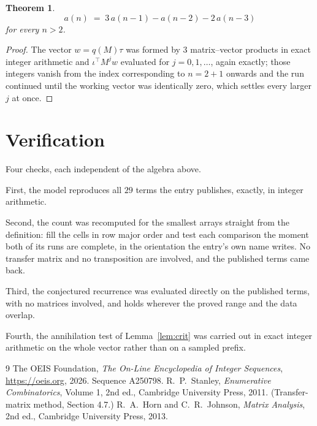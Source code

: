 \documentclass[11pt,a4paper]{article}
\theoremstyle{plain}
\newtheorem{theorem}{Theorem}
\theoremstyle{definition}
\begin{document}
\begin{theorem}
\[
a(n)\;=\;3\,a(n-1) - a(n-2) - 2\,a(n-3)
\]
for every $n>2$.
\end{theorem}

\begin{proof}
The vector $w=q(M)\tau$ was formed by $3$ matrix--vector products in exact integer
arithmetic and $\iota^{\!\top}M^{j}w$ evaluated for $j=0,1,\dots$, again exactly; those
integers vanish from the index corresponding to $n=2+1$ onwards and the run continued
until the working vector was identically zero, which settles every larger $j$ at once.
\end{proof}

\section{Verification}

Four checks, each independent of the algebra above.

First, the model reproduces all $29$ terms the entry publishes, exactly, in integer
arithmetic.

Second, the count was recomputed for the smallest arrays straight from the definition: fill the
cells in row major order and test each comparison the moment both of its runs are complete,
in the orientation the entry's own name writes. No transfer matrix and no transposition are
involved, and the published terms came back.

Third, the conjectured recurrence was evaluated directly on the published terms, with no
matrices involved, and holds wherever the proved range and the data overlap.

Fourth, the annihilation test of Lemma~\ref{lem:crit} was carried out in exact integer
arithmetic on the whole vector rather than on a sampled prefix.

\begin{thebibliography}{9}
 The OEIS Foundation, \emph{The On-Line Encyclopedia of Integer
Sequences}, \url{https://oeis.org}, 2026. Sequence A250798.
 R.~P.~Stanley, \emph{Enumerative Combinatorics}, Volume 1, 2nd ed.,
Cambridge University Press, 2011. (Transfer-matrix method, Section 4.7.)
 R.~A.~Horn and C.~R.~Johnson, \emph{Matrix Analysis}, 2nd ed., Cambridge
University Press, 2013.
\end{thebibliography}
\end{document}
